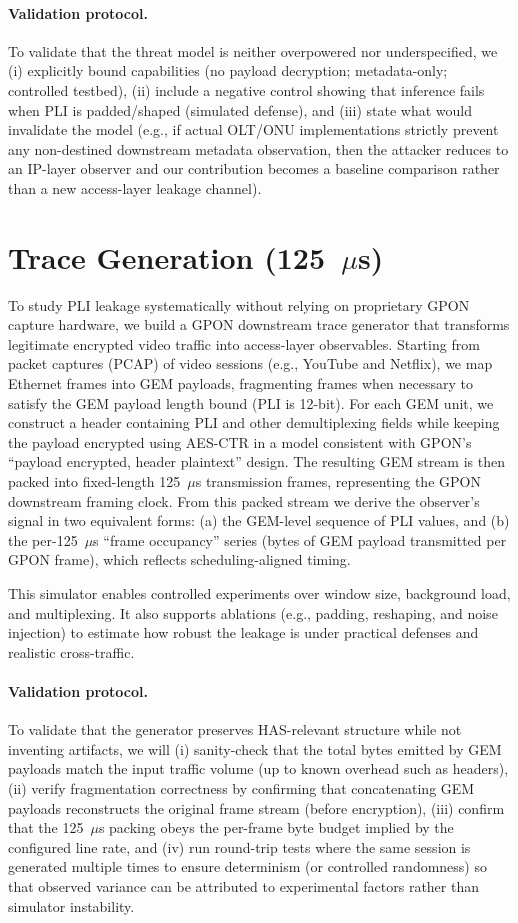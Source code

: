 \documentclass[conference]{IEEEtran}
\begin{document}
\paragraph{Validation protocol.} To validate that the threat model is neither overpowered nor underspecified, we (i) explicitly bound capabilities (no payload decryption; metadata-only; controlled testbed), (ii) include a negative control showing that inference fails when PLI is padded/shaped (simulated defense), and (iii) state what would invalidate the model (e.g., if actual OLT/ONU implementations strictly prevent any non-destined downstream metadata observation, then the attacker reduces to an IP-layer observer and our contribution becomes a baseline comparison rather than a new access-layer leakage channel).

\section{Trace Generation (125~$\mu$s)}
To study PLI leakage systematically without relying on proprietary GPON capture hardware, we build a GPON downstream trace generator that transforms legitimate encrypted video traffic into access-layer observables. Starting from packet captures (PCAP) of video sessions (e.g., YouTube and Netflix), we map Ethernet frames into GEM payloads, fragmenting frames when necessary to satisfy the GEM payload length bound (PLI is 12-bit). For each GEM unit, we construct a header containing PLI and other demultiplexing fields while keeping the payload encrypted using AES-CTR in a model consistent with GPON's ``payload encrypted, header plaintext'' design. The resulting GEM stream is then packed into fixed-length 125~$\mu$s transmission frames, representing the GPON downstream framing clock. From this packed stream we derive the observer's signal in two equivalent forms: (a) the GEM-level sequence of PLI values, and (b) the per-125~$\mu$s ``frame occupancy'' series (bytes of GEM payload transmitted per GPON frame), which reflects scheduling-aligned timing.

This simulator enables controlled experiments over window size, background load, and multiplexing. It also supports ablations (e.g., padding, reshaping, and noise injection) to estimate how robust the leakage is under practical defenses and realistic cross-traffic.

\paragraph{Validation protocol.} To validate that the generator preserves HAS-relevant structure while not inventing artifacts, we will (i) sanity-check that the total bytes emitted by GEM payloads match the input traffic volume (up to known overhead such as headers), (ii) verify fragmentation correctness by confirming that concatenating GEM payloads reconstructs the original frame stream (before encryption), (iii) confirm that the 125~$\mu$s packing obeys the per-frame byte budget implied by the configured line rate, and (iv) run round-trip tests where the same session is generated multiple times to ensure determinism (or controlled randomness) so that observed variance can be attributed to experimental factors rather than simulator instability.
\end{document}
